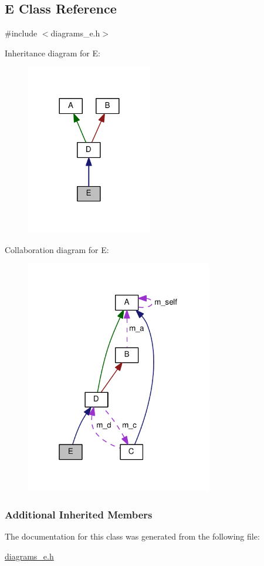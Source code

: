 \hypertarget{class_e}{}\subsection{E Class Reference}
\label{class_e}


{\ttfamily \#include $<$diagrams\+\_\+e.\+h$>$}



Inheritance diagram for E\+:
\nopagebreak
\begin{figure}[H]
\begin{center}
\leavevmode
\includegraphics[width=156pt]{class_e__inherit__graph}
\end{center}
\end{figure}


Collaboration diagram for E\+:
\nopagebreak
\begin{figure}[H]
\begin{center}
\leavevmode
\includegraphics[width=232pt]{class_e__coll__graph}
\end{center}
\end{figure}
\subsubsection*{Additional Inherited Members}


The documentation for this class was generated from the following file\+:\begin{DoxyCompactItemize}
\item 
\mbox{\hyperlink{diagrams__e_8h}{diagrams\+\_\+e.\+h}}\end{DoxyCompactItemize}
